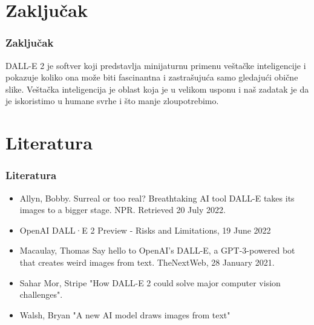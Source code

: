 \documentclass{beamer}
\begin{document}
\section{Zaključak}

\begin{frame}[fragile]\frametitle{Zaključak}
	\item DALL-E 2 je softver koji predstavlja minijaturnu primenu veštačke inteligencije i pokazuje koliko ona može biti fascinantna i zastrašujuća samo gledajući obične slike. Veštačka inteligencija je oblast koja je u velikom usponu i naš zadatak je da je iskoristimo u humane svrhe i što manje zloupotrebimo.
\end{frame}

\section{Literatura}

\begin{frame}[fragile]\frametitle{Literatura}
	\begin{itemize}
		\item Allyn, Bobby. Surreal or too real? Breathtaking AI tool DALL-E takes
its images to a bigger stage. NPR. Retrieved 20 July 2022.
		\item OpenAI DALL·E 2 Preview - Risks and Limitations, 19 June 2022
		\item Macaulay, Thomas Say hello to OpenAI’s DALL-E, a GPT-3-powered
bot that creates weird images from text. TheNextWeb, 28 January 2021.
        \item Sahar Mor, Stripe "How DALL-E 2 could solve major computer vision
challenges".
        \item Walsh, Bryan "A new AI model draws images from text"
	\end{itemize}
\end{frame}
\end{document}
